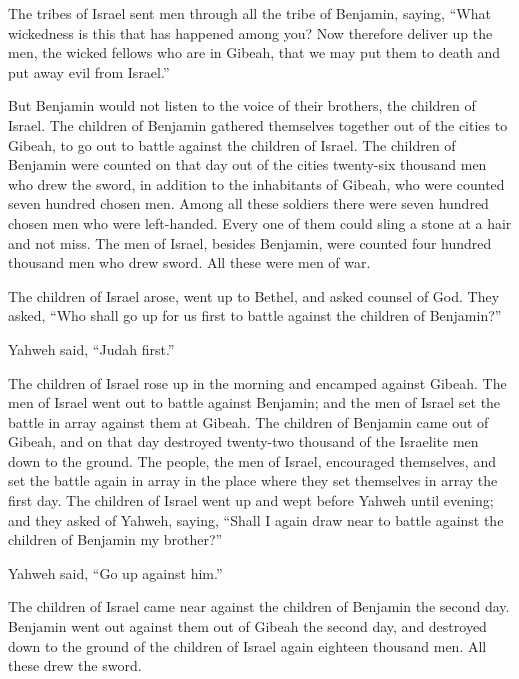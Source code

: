  The tribes of Israel sent men through all the tribe of
Benjamin, saying, ``What wickedness is this that has happened among you?
 Now therefore deliver up the men, the wicked fellows who
are in Gibeah, that we may put them to death and put away evil from
Israel.''

But Benjamin would not listen to the voice of their brothers, the
children of Israel.  The children of Benjamin gathered
themselves together out of the cities to Gibeah, to go out to battle
against the children of Israel.  The children of Benjamin
were counted on that day out of the cities twenty-six thousand men who
drew the sword, in addition to the inhabitants of Gibeah, who were
counted seven hundred chosen men.  Among all these
soldiers there were seven hundred chosen men who were left-handed. Every
one of them could sling a stone at a hair and not miss. 
The men of Israel, besides Benjamin, were counted four hundred thousand
men who drew sword. All these were men of war.

 The children of Israel arose, went up to Bethel, and
asked counsel of God. They asked, ``Who shall go up for us first to
battle against the children of Benjamin?''

Yahweh said, ``Judah first.''

 The children of Israel rose up in the morning and
encamped against Gibeah.  The men of Israel went out to
battle against Benjamin; and the men of Israel set the battle in array
against them at Gibeah.  The children of Benjamin came
out of Gibeah, and on that day destroyed twenty-two thousand of the
Israelite men down to the ground.  The people, the men of
Israel, encouraged themselves, and set the battle again in array in the
place where they set themselves in array the first day. 
The children of Israel went up and wept before Yahweh until evening; and
they asked of Yahweh, saying, ``Shall I again draw near to battle
against the children of Benjamin my brother?''

Yahweh said, ``Go up against him.''

 The children of Israel came near against the children of
Benjamin the second day.  Benjamin went out against them
out of Gibeah the second day, and destroyed down to the ground of the
children of Israel again eighteen thousand men. All these drew the
sword.

